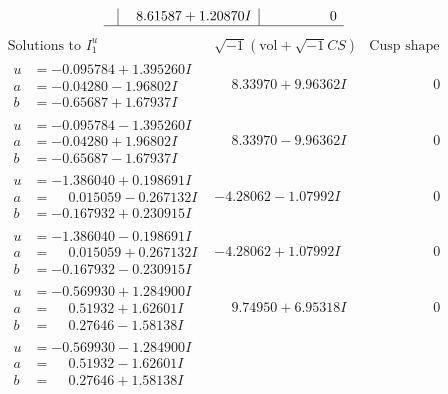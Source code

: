 \documentclass[1p]{elsarticle_modified}
\theoremstyle{definition}
\newcommand{\I}{\sqrt{-1}}
\begin{document}
$$\begin{array}{c|c|c}
 & \phantom{-}8.61587 + 1.20870 I & \phantom{-0.000000 } 0\\
 \hline 
 \end{array}$$\newpage$$\begin{array}{c|c|c}  
\text{Solutions to }I^u_{1}& \I (\text{vol} + \sqrt{-1}CS) & \text{Cusp shape}\\
 \hline 
\begin{aligned}
u &= -0.095784 + 1.395260 I \\
a &= -0.04280 - 1.96802 I \\
b &= -0.65687 + 1.67937 I\end{aligned}
 & \phantom{-}8.33970 + 9.96362 I & \phantom{-0.000000 } 0 \\ \hline\begin{aligned}
u &= -0.095784 - 1.395260 I \\
a &= -0.04280 + 1.96802 I \\
b &= -0.65687 - 1.67937 I\end{aligned}
 & \phantom{-}8.33970 - 9.96362 I & \phantom{-0.000000 } 0 \\ \hline\begin{aligned}
u &= -1.386040 + 0.198691 I \\
a &= \phantom{-}0.015059 - 0.267132 I \\
b &= -0.167932 + 0.230915 I\end{aligned}
 & -4.28062 - 1.07992 I & \phantom{-0.000000 } 0 \\ \hline\begin{aligned}
u &= -1.386040 - 0.198691 I \\
a &= \phantom{-}0.015059 + 0.267132 I \\
b &= -0.167932 - 0.230915 I\end{aligned}
 & -4.28062 + 1.07992 I & \phantom{-0.000000 } 0 \\ \hline\begin{aligned}
u &= -0.569930 + 1.284900 I \\
a &= \phantom{-}0.51932 + 1.62601 I \\
b &= \phantom{-}0.27646 - 1.58138 I\end{aligned}
 & \phantom{-}9.74950 + 6.95318 I & \phantom{-0.000000 } 0 \\ \hline\begin{aligned}
u &= -0.569930 - 1.284900 I \\
a &= \phantom{-}0.51932 - 1.62601 I \\
b &= \phantom{-}0.27646 + 1.58138 I\end{aligned}

\end{array}$$
\end{document}
